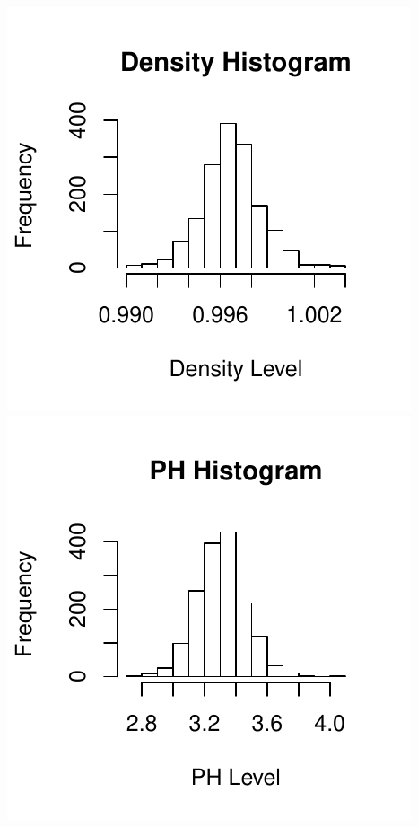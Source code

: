 \documentclass[]{article}
\begin{document}
\includegraphics{Project_files/figure-latex/unnamed-chunk-18-7.pdf}
\includegraphics{Project_files/figure-latex/unnamed-chunk-18-8.pdf}
\end{document}
